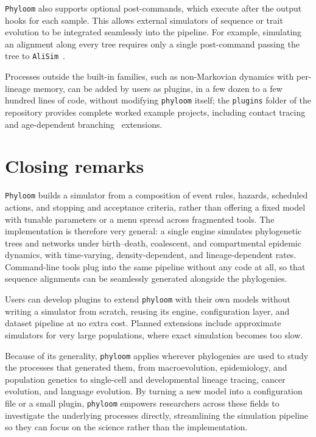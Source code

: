 \documentclass[11pt]{article}
\begin{document}
\texttt{Phyloom} also supports optional post-commands, which execute after the
output hooks for each sample. This allows external simulators of sequence or
trait evolution to be integrated seamlessly into the pipeline. For example,
simulating an alignment along every tree requires only a single post-command
passing the tree to \texttt{AliSim}~\citep{lytrong2022alisim}.

Processes outside the built-in families, such as non-Markovian dynamics
with per-lineage memory, can be added by users as plugins, in a few dozen
to a few hundred lines of code, without modifying \texttt{phyloom} itself;
the \texttt{plugins} folder of the repository provides complete worked
example projects, including contact tracing~\citep{zhukova2025contact} and age-dependent
branching~\citep{harris1963theory} extensions.

\section{Closing remarks}

\texttt{Phyloom} builds a simulator from a composition of event rules,
hazards, scheduled actions, and stopping and acceptance criteria, rather than
offering a fixed model with tunable parameters or a menu spread across
fragmented tools. The implementation is therefore very general: a single
engine simulates phylogenetic trees and networks under birth--death,
coalescent, and compartmental epidemic dynamics, with time-varying,
density-dependent, and lineage-dependent rates. Command-line tools plug
into the same pipeline without any code at all, so that sequence
alignments can be seamlessly generated alongside the phylogenies.

Users can develop plugins to extend \texttt{phyloom} with their
own models without writing a simulator from scratch, reusing its engine,
configuration layer, and dataset pipeline at no extra cost.
Planned extensions include approximate simulators for very
large populations, where exact simulation becomes too slow.

Because of its generality, \texttt{phyloom} applies wherever phylogenies are
used to study the processes that generated them, from macroevolution,
epidemiology, and population genetics to single-cell and developmental
lineage tracing, cancer evolution, and language evolution. By turning a new
model into a configuration file or a small plugin, \texttt{phyloom} empowers
researchers across these fields to investigate the underlying processes
directly, streamlining the simulation pipeline so they can focus on
the science rather than the implementation.
\end{document}
